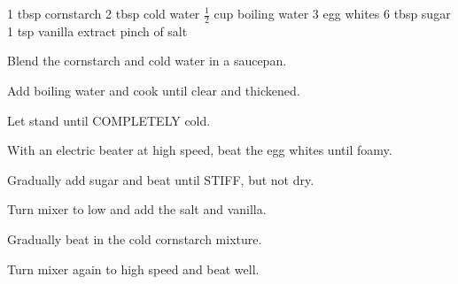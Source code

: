 \dishtype{}
\begin{ingreds}
    1 tbsp cornstarch
    2 tbsp cold water
    $\frac{1}{2}$ cup boiling water
    3 egg whites
    6 tbsp sugar
    1 tsp vanilla extract
    pinch of salt
\end{ingreds}
\begin{method}
    Blend the cornstarch and cold water in a saucepan.\par
    Add boiling water and cook until clear and thickened.\par
    Let stand until COMPLETELY cold.\par
    With an electric beater at high speed, beat the egg whites until foamy.\par
    Gradually add sugar and beat until STIFF, but not dry.\par
    Turn mixer to low and add the salt and vanilla.\par
    Gradually beat in the cold cornstarch mixture.\par
    Turn mixer again to high speed and beat well.
\end{method}